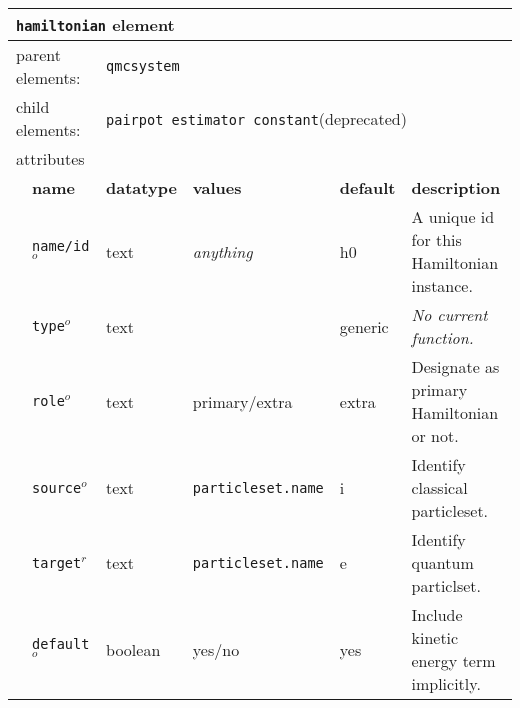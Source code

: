 \begin{table}[h]
\begin{center}
\begin{tabularx}{\textwidth}{l l l l l l }
\hline
\multicolumn{6}{l}{\texttt{hamiltonian} element} \\
\hline
\multicolumn{2}{l}{parent elements:} & \multicolumn{4}{l}{\texttt{qmcsystem}}\\
\multicolumn{2}{l}{child  elements:} & \multicolumn{4}{l}{\texttt{pairpot estimator constant}(deprecated)}\\
\multicolumn{2}{l}{attributes}  & \multicolumn{4}{l}{}\\
   &   \bfseries name     & \bfseries datatype & \bfseries values & \bfseries default   & \bfseries description \\
   &   \texttt{name/id}$^o$ &  text              & \textit{anything}& h0                  & A unique id for this Hamiltonian instance.                      \\
   &   \texttt{type}$^o$    &  text              &                  & generic             & \textit{No current function.}                      \\
   &   \texttt{role}$^o$    &  text              & primary/extra    & extra               & Designate as primary Hamiltonian or not.                      \\
   &   \texttt{source}$^o$  &  text              & \texttt{particleset.name} & i          & Identify classical particleset.                      \\
   &   \texttt{target}$^r$  &  text              & \texttt{particleset.name} & e          & Identify quantum particlset.                      \\
   &   \texttt{default}$^o$ &  boolean           & yes/no           & yes                 & Include kinetic energy term implicitly.                      \\
  \hline
\end{tabularx}
\end{center}
\end{table}




